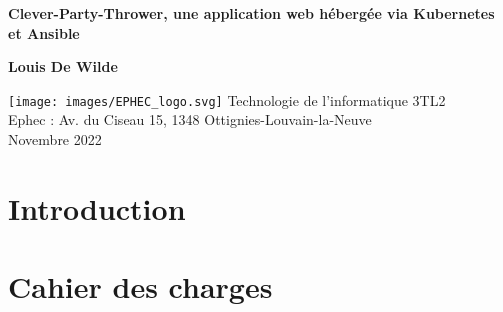 \documentclass[12pt]{article}
\begin{document}
    \begin{titlepage}
        \begin{center}
            \vspace*{1cm}

            \Huge
            \textbf{Clever-Party-Thrower, une application web hébergée via Kubernetes et Ansible}

            \vspace{0.5cm}

            \vspace{1.5cm}

            \textbf{Louis De Wilde}

            \vfill

            \texttt{[image: images/EPHEC\_logo.svg]}
            \vfill
            \vspace{0.8cm}
            \Large
            Technologie de l'informatique 3TL2 \\
            Ephec : Av. du Ciseau 15, 1348 Ottignies-Louvain-la-Neuve\\
            Novembre 2022

        \end{center}
    \end{titlepage}
    \thispagestyle{empty}
    \newpage
    \setcounter{page}{0}
    \begin{KeepFromToc}
        \tableofcontents
    \end{KeepFromToc}
    \newpage
    \section{Introduction}\label{sec:introduction}
    
    \newpage



    \section{Cahier des charges}\label{sec:cahier-des-charges}
    
    \newpage
\end{document}
